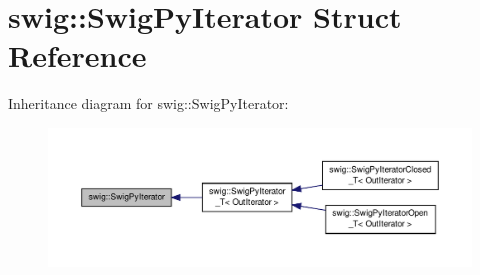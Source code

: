 \hypertarget{structswig_1_1_swig_py_iterator}{\section{swig\-:\-:Swig\-Py\-Iterator Struct Reference}
\label{structswig_1_1_swig_py_iterator}
}


Inheritance diagram for swig\-:\-:Swig\-Py\-Iterator\-:\nopagebreak
\begin{figure}[H]
\begin{center}
\leavevmode
\includegraphics[width=350pt]{structswig_1_1_swig_py_iterator__inherit__graph}
\end{center}
\end{figure}
